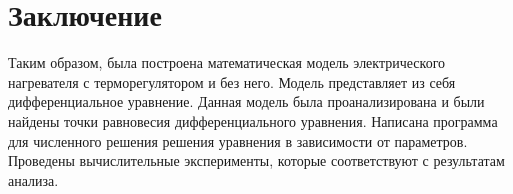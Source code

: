 \section{Заключение}
    Таким образом, была построена математическая модель электрического нагревателя с терморегулятором и без него. Модель представляет из себя дифференциальное уравнение. Данная модель была проанализирована и были найдены точки равновесия дифференциального уравнения. Написана программа для численного решения решения уравнения в зависимости от параметров. Проведены вычислительные эксперименты, которые соответствуют с результатам анализа.